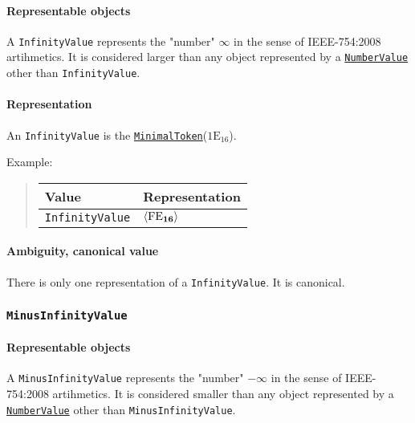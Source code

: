 \documentclass[headings=normal, headsepline, numbers=noenddot, fleqn, a4paper]{scrartcl}
\newcommand{\HexNumber}[1]{\mathrm{#1}_{16}}
\newcommand{\DborSyntaxIdent}[1]{\texttt{#1}}
\newcommand{\DborSyntaxIdentRef}[1]{\hyperlink{sec:def:#1}{\DborSyntaxIdent{#1}}}
\newcommand{\DborFirstByte}[2]{\mathbf{\textcolor{#1}{\HexNumber{#2}}}}
\newcommand{\DborFirstByteNumber}[1]{\DborFirstByte{black}{#1}}
\begin{document}
    \paragraph{Representable objects}

    A \DborSyntaxIdent{InfinityValue} represents the "number" $\infty$ in the sense of IEEE-754:2008 artihmetics.
    It is considered larger than any object represented by a \DborSyntaxIdentRef{NumberValue} 
    other than \DborSyntaxIdent{InfinityValue}.

    \paragraph{Representation}

    An \DborSyntaxIdent{InfinityValue} is the \DborSyntaxIdentRef{MinimalToken}($\HexNumber{1E}$).

    \smallskip
    \noindent
    Example:
    \nolinebreak
    \begin{quote}    
        \begin{tabular}{ll}
            \toprule
            Value & Representation \\
            \midrule
            \DborSyntaxIdent{InfinityValue} 
                & $\langle \DborFirstByteNumber{FE} \rangle$ \\
            \bottomrule
        \end{tabular}
    \end{quote}

    \paragraph{Ambiguity, canonical value}

    There is only one representation of a \DborSyntaxIdent{InfinityValue}.
    It is canonical.


    \subsubsection{\DborSyntaxIdent{MinusInfinityValue}}
    \label{sec:def:MinusInfinityValue}
    \hypertarget{sec:def:MinusInfinityValue}{}

    \paragraph{Representable objects}

    A \DborSyntaxIdent{MinusInfinityValue} represents the "number" $-\infty$ in the sense of IEEE-754:2008 artihmetics.
    It is considered smaller than any object represented by a \DborSyntaxIdentRef{NumberValue} 
    other than \DborSyntaxIdent{MinusInfinityValue}.
\end{document}
